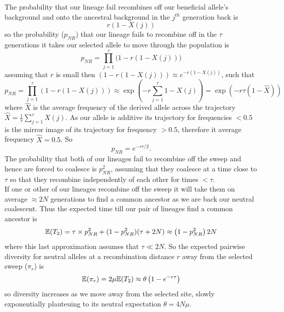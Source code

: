 The probability that our lineage fail recombines off our beneficial
allele's background and onto the
ancestral background in the $j^{th}$ generation back is
\begin{equation}
r (1-X(j))
\end{equation}
so the probability ($p_{NR}$) that our lineage fails to recombine off in the
$\tau$ generations it takes our selected allele to move through the
population is
\begin{equation}
p_{NR}=\prod_{j=1}^{\tau} \big(1- r(1-X(j))\big)
\end{equation}
assuming that $r$ is small then $ \left(1- r(1-X(j))\right) \approx
e^{-r(1-X(j))}$, such that
\begin{equation}
p_{NR}=\prod_{j=1}^{\tau} \left(1- r(1-X(j))\right) \approx \exp
\left( -r\sum_{j=1}^{\tau}
1- X(j) \right) =\exp
\left( -r \tau (1-\widehat{X}) \right)
\end{equation}
where
$\widehat{X}$ is the average frequency of the derived allele across the trajectory
$\widehat{X} = \frac{1}{\tau}  \sum_{j=1}^{\tau}
 X(j)$. As our allele is additive its trajectory for frequencies
 $<0.5$ is the mirror image of its trajectory for frequency $>0.5$, therefore it
average frequency $\widehat{X} =0.5$. So
\begin{equation}
p_{NR} = e^{-r \tau/2 }.
\end{equation}
The probability that both of our lineages fail to recombine off the
sweep and hence are forced to coalesce is $p_{NR}^2$, assuming that
they coalesce at a time close to $\tau$ so that they recombine
independently of each other for times $< \tau$.\\

If one or other of our lineages recombine off the sweep it will take them on average
$\approx 2N$ generations to find a common ancestor as we are back our
neutral coalescent. Thus the expected time
till our pair of lineages find a common ancestor is
\begin{equation}
\mathbb{E}(T_2)  = \tau \times p_{NR}^2 +(1-p_{NR}^2) (\tau +2N) \approx
\left(1-p_{NR}^2 \right) 2N
\end{equation}
where this last approximation assumes that $\tau \ll 2N$. So the
expected pairwise diversity for neutral alleles at a recombination
distance $r$ away from the selected sweep  ($\pi_r$) is
\begin{equation}
\mathbb{E}(\pi_r) = 2\mu \mathbb{E}(T_2)  \approx \theta \left(1-e^{-r\tau} \right) \label{eqn:pi_HH}
\end{equation}
so diversity increases as we move away from the selected site,
slowly exponentially plauteuing to its neutral expectation $\theta=4N\mu$.\\

